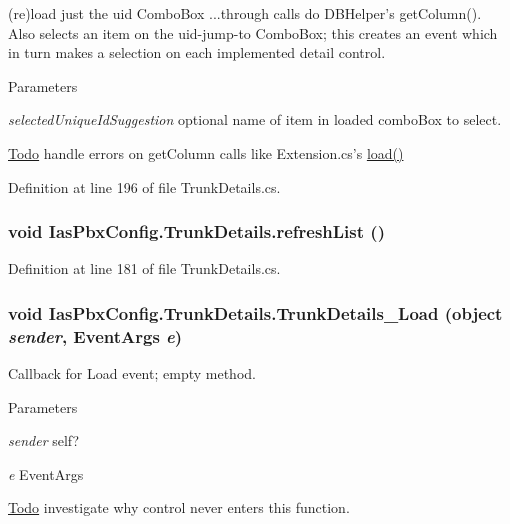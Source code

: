 (re)load just the uid ComboBox ...through calls do DBHelper's getColumn(). Also selects an item on the uid-\/jump-\/to ComboBox; this creates an event which in turn makes a selection on each implemented detail control.


\begin{DoxyParams}{Parameters}
\item[{\em selectedUniqueIdSuggestion}]optional name of item in loaded comboBox to select. \end{DoxyParams}
\begin{Desc}
\item[\hyperlink{todo__todo000046}{Todo}]handle errors on getColumn calls like Extension.cs's \hyperlink{class_ias_pbx_config_1_1_trunk_details_a2dd1283dc843a19b6d5cc13e957c322b}{load()} \end{Desc}


Definition at line 196 of file TrunkDetails.cs.\hypertarget{class_ias_pbx_config_1_1_trunk_details_a043ccba78a5c1bde053f3f7e23502b33}{
\subsubsection[{refreshList}]{\setlength{\rightskip}{0pt plus 5cm}void IasPbxConfig.TrunkDetails.refreshList ()}}
\label{class_ias_pbx_config_1_1_trunk_details_a043ccba78a5c1bde053f3f7e23502b33}


Definition at line 181 of file TrunkDetails.cs.\hypertarget{class_ias_pbx_config_1_1_trunk_details_ab9b3bd0939b49cb616b15a7de3cb1d77}{
\subsubsection[{TrunkDetails\_\-Load}]{\setlength{\rightskip}{0pt plus 5cm}void IasPbxConfig.TrunkDetails.TrunkDetails\_\-Load (object {\em sender}, \/  EventArgs {\em e})}}
\label{class_ias_pbx_config_1_1_trunk_details_ab9b3bd0939b49cb616b15a7de3cb1d77}


Callback for Load event; empty method. 
\begin{DoxyParams}{Parameters}
\item[{\em sender}]self? \item[{\em e}]EventArgs \end{DoxyParams}
\begin{Desc}
\item[\hyperlink{todo__todo000049}{Todo}]investigate why control never enters this function. \end{Desc}


